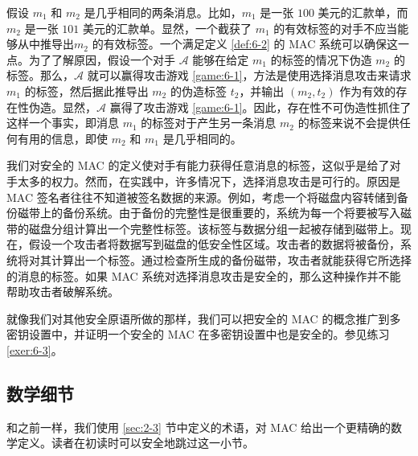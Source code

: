 \begin{example}\label{exmp:6-3}
假设 $m_1$ 和 $m_2$ 是几乎相同的两条消息。比如，$m_1$ 是一张 $100$ 美元的汇款单，而 $m_2$ 是一张 $101$ 美元的汇款单。显然，一个截获了 $m_1$ 的有效标签的对手不应当能够从中推导出$m_2$ 的有效标签。一个满足定义 \ref{def:6-2} 的 MAC 系统可以确保这一点。为了了解原因，假设一个对手 $\mathcal{A}$ 能够在给定 $m_1$ 的标签的情况下伪造 $m_2$ 的标签。那么，$\mathcal{A}$ 就可以赢得攻击游戏 \ref{game:6-1}，方法是使用选择消息攻击来请求 $m_1$ 的标签，然后据此推导出 $m_2$ 的伪造标签 $t_2$，并输出 $(m_2,t_2)$ 作为有效的存在性伪造。显然，$\mathcal{A}$ 赢得了攻击游戏 \ref{game:6-1}。因此，存在性不可伪造性抓住了这样一个事实，即消息 $m_1$ 的标签对于产生另一条消息 $m_2$ 的标签来说不会提供任何有用的信息，即使 $m_2$ 和 $m_1$ 是几乎相同的。
\end{example}

\begin{example}\label{exmp:6-4}
我们对安全的 MAC 的定义使对手有能力获得任意消息的标签，这似乎是给了对手太多的权力。然而，在实践中，许多情况下，选择消息攻击是可行的。原因是 MAC 签名者往往不知道被签名数据的来源。例如，考虑一个将磁盘内容转储到备份磁带上的备份系统。由于备份的完整性是很重要的，系统为每一个将要被写入磁带的磁盘分组计算出一个完整性标签。该标签与数据分组一起被存储到磁带上。现在，假设一个攻击者将数据写到磁盘的低安全性区域。攻击者的数据将被备份，系统将对其计算出一个标签。通过检查所生成的备份磁带，攻击者就能获得它所选择的消息的标签。如果 MAC 系统对选择消息攻击是安全的，那么这种操作并不能帮助攻击者破解系统。
\end{example}

\begin{remark}\label{remark:6-1}
就像我们对其他安全原语所做的那样，我们可以把安全的 MAC 的概念推广到多密钥设置中，并证明一个安全的 MAC 在多密钥设置中也是安全的。参见练习 \ref{exer:6-3}。
\end{remark}

\subsection{数学细节}

和之前一样，我们使用 \ref{sec:2-3} 节中定义的术语，对 MAC 给出一个更精确的数学定义。读者在初读时可以安全地跳过这一小节。

